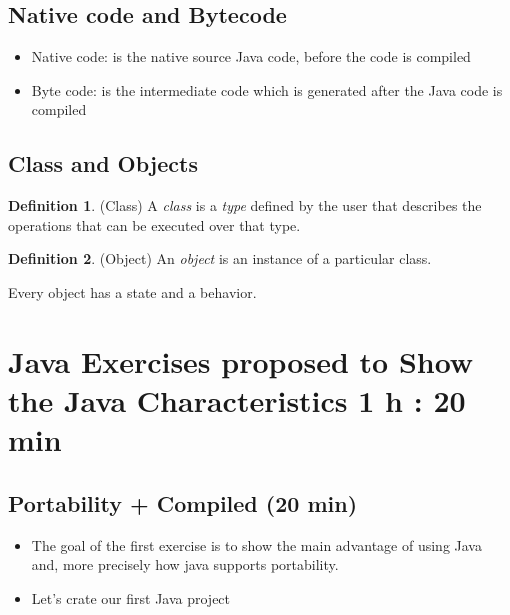 \documentclass{article}
\theoremstyle{definition}
\newtheorem{mydef}{Definition}
\begin{document}
\subsection{Native code and Bytecode}
\begin{itemize}
\item Native code: is the native source Java code, before the code is compiled
\item Byte code: is the intermediate code which is generated after the Java code is compiled
\end{itemize}


\subsection{Class and Objects}

\begin{mydef} (Class) A \emph{class} is a \emph{type} defined by the user that describes the operations that can be executed over that type.
\end{mydef}

\begin{mydef} (Object) An \emph{object} is an instance of a particular class.
\end{mydef}

Every object has a state and a behavior.


\section{Java Exercises proposed to Show the Java Characteristics 1 h : 20 min}
\subsection{Portability + Compiled (20 min)}
\begin{itemize}
\item The goal of the first exercise is to show the main advantage of using Java and, more precisely how java supports portability.
\item Let's crate our first Java project
\end{itemize}
\end{document}

